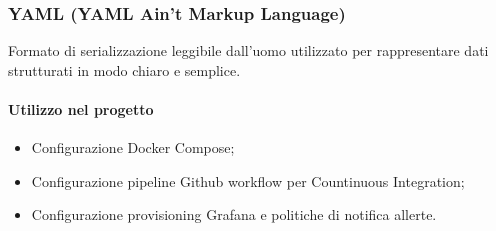 \subsubsection{YAML (YAML Ain't Markup Language)}
Formato di serializzazione leggibile dall'uomo utilizzato per rappresentare dati strutturati in modo chiaro e semplice.

\paragraph{Utilizzo nel progetto}
\begin{itemize}
    \item Configurazione Docker Compose;
    \item Configurazione pipeline Github workflow per Countinuous Integration;
    \item Configurazione provisioning Grafana e politiche di notifica allerte.
\end{itemize}